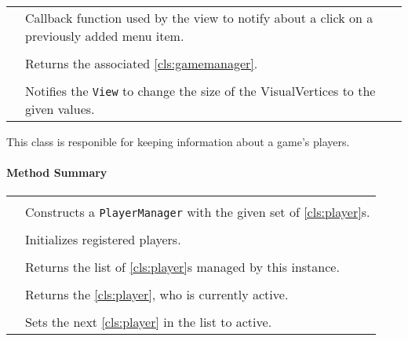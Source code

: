 \begin{longtable}{Lp{10cm}}
	& Callback function used by the view to notify about a click on a previously added menu item.  \\
	 \\
	& Returns the associated \ref{cls:gamemanager}. \\
	 \\
	& Notifies the \texttt{View} to change the size of the VisualVertices to the given values. \\
	\hline
\end{longtable}

\pagebreak

This class is responible for keeping information about a game's players.  \\

\centerdash

\paragraph*{Method Summary}
\paragraph*{}
\begin{longtable}{Lp{10cm}}
	\startmethodtable
	 \\
	& Constructs a \texttt{PlayerManager} with the given set of \ref{cls:player}s. \\
	 \\
	& Initializes registered players. \\
	 \\
	& Returns the list of \ref{cls:player}s managed by this instance. \\
	 \\
	& Returns the \ref{cls:player}, who is currently active. \\
	 \\
	& Sets the next \ref{cls:player} in the list to active. \\
	\hline
\end{longtable}

